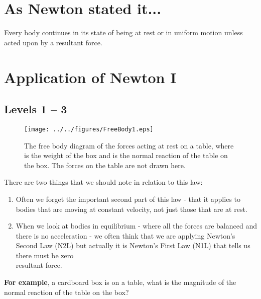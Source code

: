 




\addtolength{\topmargin}{-0.6 cm}
\setlength{\columnsep}{22pt}

\section{As Newton stated it...}

Every body continues in its state of being at rest or in uniform motion unless acted upon by a resultant force.

\setlength{\columnsep}{22pt}
\section{Application of Newton I}
\subsection*{Levels 1 -- 3}
\begin{wrapfigure}{r}{6cm}
\vspace{-3.0cm}
\center
\texttt{[image: ../../figures/FreeBody1.eps]}
\caption{The free body diagram of the forces acting  at rest on a table, where  is the weight of the box and  is the normal reaction of the table on the box.  The forces on the table are not drawn here.}\vspace{-3.5cm}
\end{wrapfigure}

There are two things that we should note in relation to this law:
\begin{enumerate}
\item Often we forget the important second part of this law - that it applies to bodies that are moving at constant velocity, not just those that are at rest.   

\item When we look at bodies in equilibrium - where all the forces are balanced and there is no acceleration - we often think that we are applying Newton's Second Law (N2L) but actually it is Newton's First Law (N1L) that tells us there must be zero\\
resultant force.

\end{enumerate}
{\bf For example}, a cardboard box is  on a table, what is the magnitude of the normal reaction of the table on the box? \\

